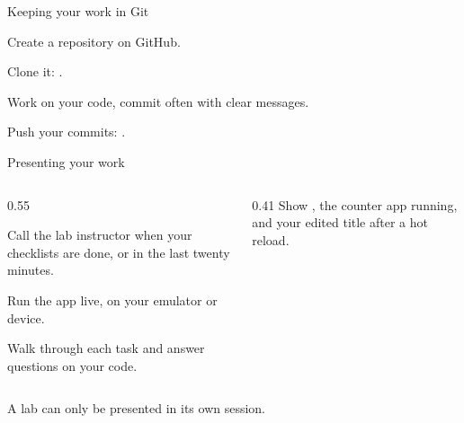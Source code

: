 \documentclass[10pt,aspectratio=169,t]{beamer}
\begin{document}
\begin{frame}[eyebrow=GitHub]{Keeping your work in Git}
  \begin{steps}
    \item Create a repository on GitHub.
    \item Clone it: .
    \item Work on your code, commit often with clear messages.
    \item Push your commits: .
  \end{steps}
  \vskip 3mm
\end{frame}

\begin{frame}[eyebrow=Presentation]{Presenting your work}
  \begin{columns}[T]
    \begin{column}{0.55\textwidth}
      \begin{steps}
        \item Call the lab instructor when your checklists are done, or in the last twenty minutes.
        \item Run the app live, on your emulator or device.
        \item Walk through each task and answer questions on your code.
      \end{steps}
    \end{column}
    \begin{column}{0.41\textwidth}
      Show , the counter app running, and your edited title after a hot reload.
    \end{column}
  \end{columns}
  \begin{takeaway}{A lab can only be presented in its own session.}
  \end{takeaway}
\end{frame}

\end{document}
